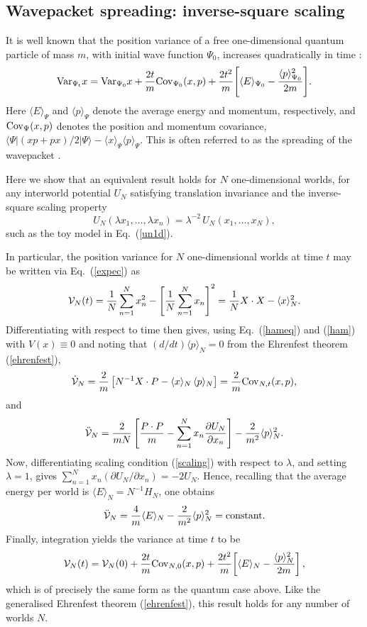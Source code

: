 \documentclass[twocolumn,aps,pra,amsmath,amssymb,superscriptaddress]{revtex4}
\renewcommand{\(}{\left(}
\renewcommand{\)}{\right)}
\begin{document}
\subsection{Wavepacket spreading: inverse-square scaling}

It is well known that the position variance of a free one-dimensional quantum particle of mass $m$, with initial wave function $\Psi_0$, increases quadratically in time \cite{merz}:
\[ {\rm Var_{\Psi_t}} x = {\rm Var_{\Psi_0}}x + \frac{2t}{m}{\rm Cov}_{\Psi_0}(x,p) + \frac{2t^2}{m}\!\left[\langle E\rangle_{\Psi_0}- \frac{\langle p\rangle_{\Psi_0} ^2}{2m}\right]\!. \]
Here  $\langle E\rangle_{\Psi}$ and  $\langle p\rangle_{\Psi} $ denote the average energy and momentum, respectively, and ${\rm Cov}_\Psi(x,p)$ denotes the position and momentum covariance, $\langle\Psi| (xp+px)/2|\Psi\rangle - \langle x\rangle_{\Psi} \langle p\rangle_{\Psi}$.  This is often referred to as the spreading of the wavepacket \cite{merz}.

Here we show that an equivalent result holds for $N$ one-dimensional worlds, for any interworld potential $U_N$ satisfying translation invariance and the inverse-square scaling property
\begin{equation} \label{scaling}
U_N(\lambda x_1,\dots,\lambda x_n) = \lambda^{-2}\, U_N(x_1,\dots,x_N) , 
\end{equation}
such as the toy model in Eq.~(\ref{un1d}).  

In particular,  the position variance for $N$ one-dimensional worlds at time $t$ may be written via Eq.~(\ref{expec}) as
\[ {\cal V}_N(t) = \frac{1}{N}\sum_{n=1}^N x_n^2 - \left[\frac{1}{N}\sum_{n=1}^N x_n\right]^2 = \frac{1}{N}{X}\cdot {X} -\langle x\rangle_N^2. \]
Differentiating with respect to time then gives, using Eq.~(\ref{hameq}) and (\ref{ham}) with $V(x)\equiv 0$ and noting that $(d/dt)\langle p\rangle_N=0$ from the Ehrenfest theorem (\ref{ehrenfest}),
\[ \dot{\cal V}_N = \frac{2}{m}\left[ N^{-1} {X}\cdot{P}  - \langle x\rangle_N\,\langle p\rangle_N\right] = \frac{2}{m}{\rm Cov}_{N,t}(x,p), \] 
and 
\[
\ddot{\cal V}_N = \frac{2}{mN}\left[ \frac{P\cdot P}{m} -\sum_{n=1}^N x_n\frac{\partial U_N}{\partial x_n}\right] - \frac{2}{m^2}\langle p\rangle_N^2.
\]
Now, differentiating scaling condition (\ref{scaling}) with respect to $\lambda$, and setting $\lambda=1$, gives $\sum_{n=1}^N x_n (\partial U_N/\partial x_n) = -2U_N$.  Hence, recalling that the average energy per world is $\langle E\rangle_N=N^{-1}H_N$, one obtains
\[ \ddot{\cal V}_N = \frac{4}{m}\langle E\rangle_N - \frac{2}{m^2}\langle p\rangle_N^2 = {\rm constant}. \]
Finally, integration yields the variance at time $t$ to be
\begin{equation} \label{spreadn}
{\cal V}_N(t) = {\cal V}_N(0) + \frac{2t}{m}{\rm Cov}_{N,0}(x,p) + \frac{2t^2}{m}\!\left[\langle E\rangle_N- \frac{\langle p\rangle_N^2}{2m}\right],
\end{equation}
which is of precisely the same form as the quantum case above. Like the generalised Ehrenfest theorem (\ref{ehrenfest}), this result holds for any number of worlds $N$.
\end{document}
